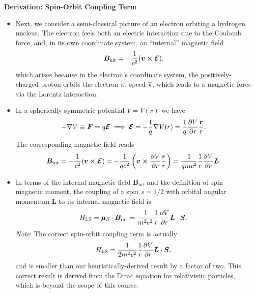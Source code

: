 \documentclass[11pt, a4paper]{article}
\renewcommand{\grad}{\nabla}
\renewcommand{\vec}[1]{\bm{#1}}  %
\newcommand{\uvec}[1]{\hat{\vec{#1}}}  %
\renewcommand{\r}{\vec{r}}  %
\renewcommand{\L}{\vec{L}}  %
\renewcommand{\S}{\vec{S}}  %
\newcommand{\B}{\vec{B}}  %
\newcommand{\m}{\vec{\mu}}  %
\begin{document}
\textbf{Derivation: Spin-Orbit Coupling Term}
\begin{itemize}
	\item Next, we consider a semi-classical picture of an electron orbiting a hydrogen nucleus. The electron feels both an electric interaction due to the Coulomb force, and, in its own coordinate system, an ``internal'' magnetic field 
	\begin{equation*}
		\B_{\text{int}} = -\frac{1}{c^{2}}(\vec{v} \cross \vec{\mathcal{E}}),
	\end{equation*}
	which arises because in the electron's coordinate system, the positively-charged proton orbits the electron at speed $ \uvec{v} $, which leads to a magnetic force via the Lorentz interaction.
	
	\item In a spherically-symmetric potential $ V = V(r) $ we have
	\begin{equation*}
        - \grad V \equiv \vec{F} = q \vec{\mathcal{E}} \implies \vec{\mathcal{E}} = - \frac{1}{q}\grad V(r) = \frac{1}{q}\pdv{V}{r} \frac{\r}{r}.
	\end{equation*}
	The corresponding magnetic field reads
	\begin{equation*}
        \B_{\text{int}} = - \frac{1}{c^{2}} (\vec{v} \cross \vec{\mathcal{E}}) = -\frac{1}{qc^{2}}\left(\vec{v} \cross \pdv{V}{r}\frac{\r}{r}\right) = \frac{1}{qmc^{2}}\frac{1}{r}\pdv{V}{r}\L.
	\end{equation*}
	
    \item In terms of the internal magnetic field $ \B_{\text{int}} $ and the definition of spin magnetic moment, the coupling of a spin $ s = 1/2 $ with orbital angular momentum $ \L $ to its internal magnetic field is
	\begin{equation*}
        H_{\text{LS}} = \m_{S} \cdot \B_{\text{int}} = \frac{1}{m^{2}c^{2}}\frac{1}{r}\pdv{V}{r} \L \cdot \S.
	\end{equation*}
    \textit{Note}: The correct spin-orbit coupling term is actually
    \begin{equation*}
        H_{\text{LS}} = \frac{1}{2m^{2}c^{2}} \frac{1}{r} \pdv{V}{r} \L \cdot \S,
    \end{equation*}
    and is smaller than our heuristically-derived result by a factor of two. This correct result is derived from the Dirac equation for relativistic particles, which is beyond the scope of this course. 
	
\end{itemize}
\end{document}
